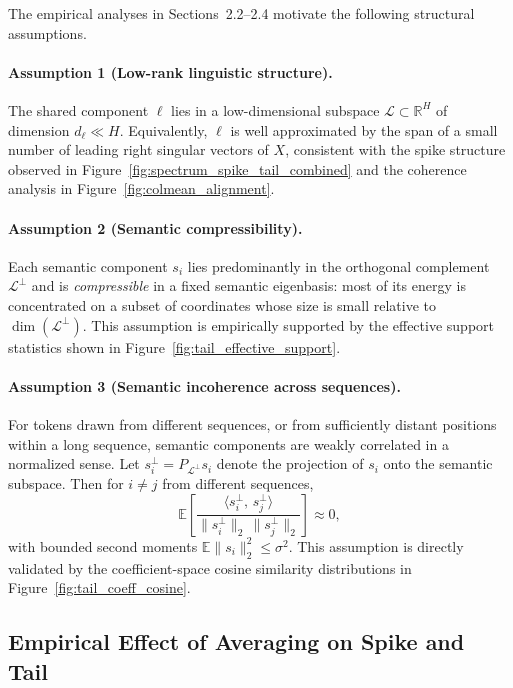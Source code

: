The empirical analyses in Sections~2.2--2.4 motivate the following structural
assumptions.

\paragraph{Assumption 1 (Low-rank linguistic structure).}
The shared component $\ell$ lies in a low-dimensional subspace
$\mathcal{L} \subset \mathbb{R}^H$ of dimension $d_\ell \ll H$.
Equivalently, $\ell$ is well approximated by the span of a small number of leading
right singular vectors of $X$, consistent with the spike structure observed in
Figure~\ref{fig:spectrum_spike_tail_combined} and the coherence analysis in
Figure~\ref{fig:colmean_alignment}.

\paragraph{Assumption 2 (Semantic compressibility).}
Each semantic component $s_i$ lies predominantly in the orthogonal complement
$\mathcal{L}^\perp$ and is \emph{compressible} in a fixed semantic eigenbasis:
most of its energy is concentrated on a subset of coordinates whose size is small
relative to $\dim(\mathcal{L}^\perp)$.
This assumption is empirically supported by the effective support statistics
shown in Figure~\ref{fig:tail_effective_support}.

\paragraph{Assumption 3 (Semantic incoherence across sequences).}
For tokens drawn from different sequences, or from sufficiently distant
positions within a long sequence, semantic components are weakly correlated in a
normalized sense.
Let $s_i^{\perp} = P_{\mathcal{L}^\perp}s_i$ denote the projection of $s_i$ onto the
semantic subspace.
Then for $i \neq j$ from different sequences,
\begin{equation}
\label{eq:assump_cos_incoh}
\mathbb{E}\!\left[
\frac{\langle s_i^{\perp},\, s_j^{\perp}\rangle}
{\|s_i^{\perp}\|_2\,\|s_j^{\perp}\|_2}
\right]
\approx 0,
\end{equation}
with bounded second moments $\mathbb{E}\|s_i\|_2^2 \le \sigma^2$.
This assumption is directly validated by the coefficient-space cosine similarity
distributions in Figure~\ref{fig:tail_coeff_cosine}.

\subsection{Empirical Effect of Averaging on Spike and Tail}
\label{subsec:avg_empirical}

